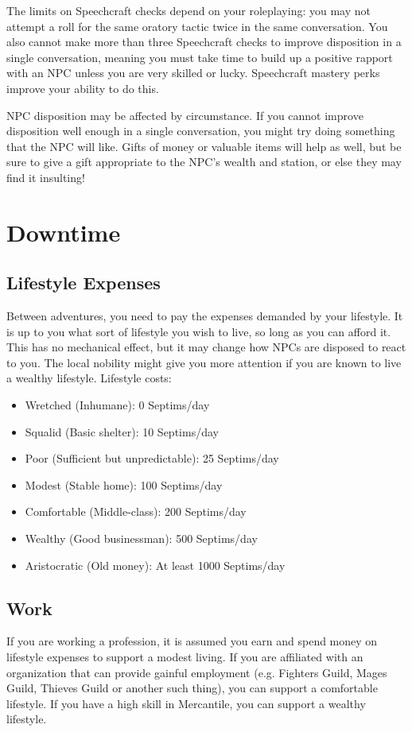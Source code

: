 The limits on Speechcraft checks depend on your roleplaying: you may not attempt a roll for the same oratory tactic twice in the same conversation. You also cannot make more than three Speechcraft checks to improve disposition in a single conversation, meaning you must take time to build up a positive rapport with an NPC unless you are very skilled or lucky. Speechcraft mastery perks improve your ability to do this.

NPC disposition may be affected by circumstance. If you cannot improve disposition well enough in a single conversation, you might try doing something that the NPC will like. Gifts of money or valuable items will help as well, but be sure to give a gift appropriate to the NPC's wealth and station, or else they may find it insulting!

\section{Downtime}

\subsection{Lifestyle Expenses}
Between adventures, you need to pay the expenses demanded by your lifestyle. It is up to you what sort of lifestyle you wish to live, so long as you can afford it. This has no mechanical effect, but it may change how NPCs are disposed to react to you. The local nobility might give you more attention if you are known to live a wealthy lifestyle. Lifestyle costs:

\begin{itemize}
	\item Wretched (Inhumane): 0 Septims/day
	\item Squalid (Basic shelter): 10 Septims/day
	\item Poor (Sufficient but unpredictable): 25 Septims/day
	\item Modest (Stable home): 100 Septims/day
	\item Comfortable (Middle-class): 200 Septims/day
	\item Wealthy (Good businessman): 500 Septims/day
	\item Aristocratic (Old money): At least 1000 Septims/day
\end{itemize}

\subsection{Work}
If you are working a profession, it is assumed you earn and spend money on lifestyle expenses to support a modest living. If you are affiliated with an organization that can provide gainful employment (e.g. Fighters Guild, Mages Guild, Thieves Guild or another such thing), you can support a comfortable lifestyle. If you have a high skill in Mercantile, you can support a wealthy lifestyle.

